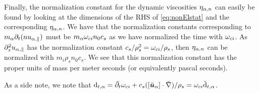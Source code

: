 Finally, the normalization constant for the dynamic viscosities $\eta_{\alpha,n}$ can easily be found by looking at the dimensions of the RHS of \cref{eq:nonElstat} and the corresponding $\eta_{\alpha,n}$.
We have that the normalization constants corresponding to $m_\alpha \partial_t(nu_{\alpha,\|})$ must be $m_\alpha\omega_{ci}n_0c_s$ as we have normalized the time with $\omega_{ci}$.
As $\partial_z^2 u_{\alpha,\|}$ has the normalization constant $c_s/\rho_s^2=\omega_{ci}/\rho_s$, then $\eta_{\alpha,n}$ can be normalized with $m_i\rho_s n_0c_s$.
We see that this normalization constant has the proper units of mass per meter seconds (or equivalently pascal seconds).

As a side note, we note that
$\text{d}_{t,\alpha} = \breve{\partial_t}\omega_{ci} + c_s ([\breve{\boldsymbol{u}}_\alpha]\cdot
    \breve{\nabla})/{\rho_s} = \omega_{ci}\breve{\text{d}}_{t,\alpha}$.

